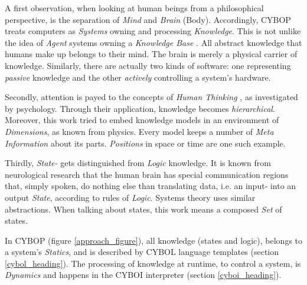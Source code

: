 A first observation, when looking at human beings from a philosophical
perspective, is the separation of \emph{Mind} and \emph{Brain} (Body).
Accordingly, CYBOP treats computers as \emph{Systems} owning and processing
\emph{Knowledge}. This is not unlike the idea of \emph{Agent} systems owning a
\emph{Knowledge Base} \cite{parks,kuehnel}. All abstract knowledge that humans
make up belongs to their mind. The brain is merely a physical carrier of
knowledge. Similarly, there are actually two kinds of software: one
representing \emph{passive} knowledge and the other \emph{actively} controlling
a system's hardware.

Secondly, attention is payed to the concepts of \emph{Human Thinking}
\cite{heller2004}, as investigated by psychology. Through their application,
knowledge becomes \emph{hierarchical}. Moreover, this work tried to embed
knowledge models in an environment of \emph{Dimensions}, as known from physics.
Every model keeps a number of \emph{Meta Information} about its parts.
\emph{Positions} in space or time are one such example.

Thirdly, \emph{State-} gets distinguished from \emph{Logic} knowledge. It is
known from neurological research that the human brain has special communication
regions that, simply spoken, do nothing else than translating data, i.e. an
input- into an output \emph{State}, according to rules of \emph{Logic}. Systems
theory uses similar abstractions. When talking about states, this work means a
composed \emph{Set} of states.

In CYBOP (figure \ref{approach_figure}), all knowledge (states and logic),
belongs to a system's \emph{Statics}, and is described by CYBOL language
templates (section \ref{cybol_heading}). The processing of knowledge at
runtime, to control a system, is \emph{Dynamics} and happens in the CYBOI
interpreter (section \ref{cyboi_heading}).




